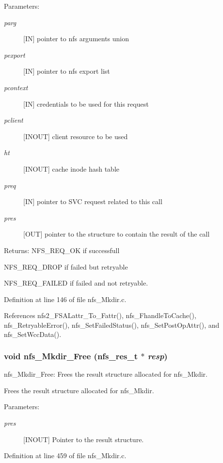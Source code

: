 \begin{Desc}
\item[Parameters:]
\begin{description}
\item[{\em parg}][IN] pointer to nfs arguments union \item[{\em pexport}][IN] pointer to nfs export list \item[{\em pcontext}][IN] credentials to be used for this request \item[{\em pclient}][INOUT] client resource to be used \item[{\em ht}][INOUT] cache inode hash table \item[{\em preq}][IN] pointer to SVC request related to this call \item[{\em pres}][OUT] pointer to the structure to contain the result of the call\end{description}
\end{Desc}
\begin{Desc}
\item[Returns:]NFS\_\-REQ\_\-OK if successfull \par
 NFS\_\-REQ\_\-DROP if failed but retryable \par
 NFS\_\-REQ\_\-FAILED if failed and not retryable. \end{Desc}


Definition at line 146 of file nfs\_\-Mkdir.c.

References nfs2\_\-FSALattr\_\-To\_\-Fattr(), nfs\_\-Fhandle\-To\-Cache(), nfs\_\-Retryable\-Error(), nfs\_\-Set\-Failed\-Status(), nfs\_\-Set\-Post\-Op\-Attr(), and nfs\_\-Set\-Wcc\-Data().
\subsubsection{\setlength{\rightskip}{0pt plus 5cm}void nfs\_\-Mkdir\_\-Free (nfs\_\-res\_\-t $\ast$ {\em resp})}\label{nfs__Mkdir_8c_a1}


nfs\_\-Mkdir\_\-Free: Frees the result structure allocated for nfs\_\-Mkdir.

Frees the result structure allocated for nfs\_\-Mkdir.

\begin{Desc}
\item[Parameters:]
\begin{description}
\item[{\em pres}][INOUT] Pointer to the result structure. \end{description}
\end{Desc}


Definition at line 459 of file nfs\_\-Mkdir.c.